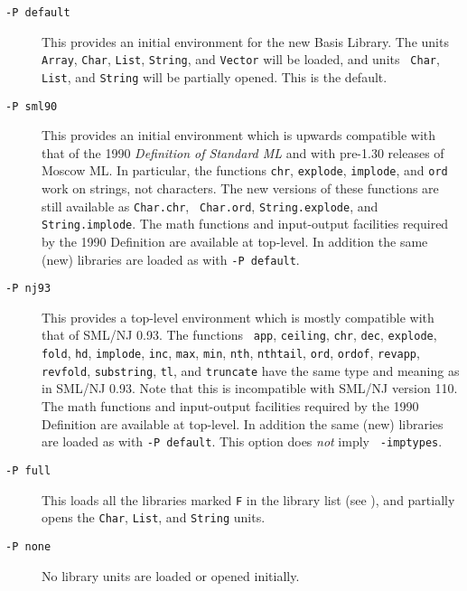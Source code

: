 \documentclass[fleqn]{article}
\begin{document}
\begin{description}
  \begin{description}
  \item[{\tt -P default}] This provides an initial environment for the
    new Basis Library.  The units {\tt Array}, {\tt Char}, {\tt List},
    {\tt String}, and {\tt Vector} will be loaded, and units {\tt
      Char}, {\tt List}, and {\tt String} will be partially opened.
    This is the default.

  \item[{\tt -P sml90}] This provides an initial environment which is
    upwards compatible with that of the 1990 {\em Definition of
      Standard ML\/} and with pre-1.30 releases of Moscow ML\@.  In
    particular, the functions {\tt chr}, {\tt explode}, {\tt implode},
    and {\tt ord} work on strings, not characters.  The new versions
    of these functions are still available as {\tt Char.chr}, {\tt
      Char.ord}, {\tt String.explode}, and {\tt String.implode}.  The
    math functions and input-output facilities required by the 1990
    Definition \cite[Appendix C and D]{Milner:1990:TheDefinition} are
    available at top-level.  In addition the same (new) libraries are
    loaded as with {\tt -P default}.

  \item[{\tt -P nj93}] This provides a top-level environment which is
    mostly compatible with that of SML/NJ 0.93.  The functions {\tt
      app}, {\tt ceiling}, {\tt chr}, {\tt dec}, {\tt explode}, {\tt
      fold}, {\tt hd}, {\tt implode}, {\tt inc}, {\tt max}, {\tt min},
    {\tt nth}, {\tt nthtail}, {\tt ord}, {\tt ordof}, {\tt revapp},
    {\tt revfold}, {\tt substring}, {\tt tl}, and {\tt truncate} have
    the same type and meaning as in SML/NJ 0.93.  Note that this is
    incompatible with SML/NJ version 110\@.  The math functions and
    input-output facilities required by the 1990 Definition
    \cite[Appendix C and D]{Milner:1990:TheDefinition} are available
    at top-level.  In addition the same (new) libraries are loaded as
    with {\tt -P default}.  This option does {\em not\/} imply {\tt
      -imptypes}.

  \item[{\tt -P full}] This loads all the libraries marked {\tt F} in
    the library list (see \cite{MoscowML:2000:MoscowMLLanguage}), and
  partially opens the {\tt Char}, {\tt List}, and {\tt String} units.

  \item[{\tt -P none}] No library units are loaded or opened initially.
  \end{description}
  

\end{description}
\end{document}
